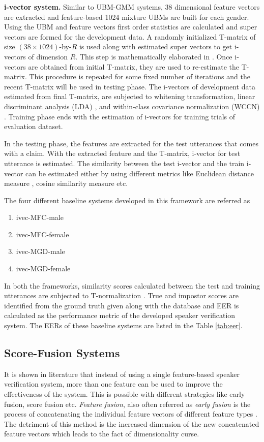 \documentclass{article}
\begin{document}
\textbf{i-vector system.} 
Similar to UBM-GMM systems, 38 dimensional feature vectors are extracted and feature-based 1024 mixture UBMs are built for each gender.  Using the UBM and feature vectors first order statistics are calculated and super vectors are formed for the development data. A randomly initialized T-matrix of size $(38\times1024)$-by-$R$ is used along with estimated super vectors to get i-vectors of dimension $R$. This step is mathematically elaborated in \cite{dehak_ivector, kenny_JFA}. Once i-vectors are obtained from initial T-matrix, they are used to re-estimate the T-matrix. This procedure is repeated for some fixed number of iterations and the recent T-matrix will be used in testing phase. The  i-vectors of development data estimated from final T-matrix, are subjected to whitening transformation, linear discriminant analysis (LDA) \cite{lda, lda_tutorial}, and within-class covariance normalization (WCCN) \cite{dehak_ivector, wccn}. Training phase ends with the estimation of i-vectors for training trials of evaluation dataset. 

In the testing phase, the features are extracted for the test utterances that comes with a claim. With the extracted feature and the T-matrix, i-vector for test utterance is estimated. The similarity between the test i-vector and the train i-vector can be estimated either by using different metrics like Euclidean distance measure \cite{euclid}, cosine similarity measure \cite{z_norm_cosine} etc. 

The four different baseline systems developed in this framework are referred as 
\begin{enumerate}
\item ivec-MFC-male
\item ivec-MFC-female
\item ivec-MGD-male
\item ivec-MGD-female
\end{enumerate}

In both the frameworks, similarity scores calculated between the test and training utterances are subjected to T-normalization \cite{tnorm}. True and impostor scores are identified from the ground truth given along with the database and EER is calculated as the performance metric of the developed speaker verification system. The EERs of these baseline systems are listed in the Table \ref{tab:eer}.

\subsection{Score-Fusion Systems}
\label{subsec:scoreFusion}
	It is shown in literature that instead of using a single feature-based speaker verification system, more than one feature can be used to improve the effectiveness of the system. This is possible with different strategies like early fusion, score fusion etc. {\it Feature fusion}, also often referred as {\it early fusion} is the process of concatenating the individual feature vectors of different feature types \cite{padmanInterspeech2010}. The detriment of this method is the increased dimension of the new concatenated feature vectors which leads to the fact of dimensionality curse. 
	
\end{document}
